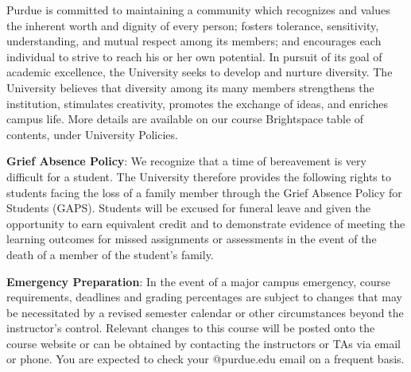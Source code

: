 \documentclass[11pt]{article}
\begin{document}
	\vspace{0.05in}
	
	Purdue is committed to maintaining a community which recognizes and values the inherent worth and 
	dignity of every person; fosters tolerance, sensitivity, understanding, and mutual respect among its 
	members; and encourages each individual to strive to reach his or her own potential. In pursuit of its goal 
	of academic excellence, the University seeks to develop and nurture diversity. The University believes 
	that diversity among its many members strengthens the institution, stimulates creativity, promotes the 
	exchange of ideas, and enriches campus life. More details are available on our course Brightspace table of 
	contents, under University Policies.
	
	\bigskip
	
	\textbf{Grief Absence Policy}: We recognize that a time of bereavement is very difficult for a student. The University therefore 
	provides the following rights to students facing the loss of a family member through the Grief 
	Absence Policy for Students (GAPS). Students will be excused for funeral leave and given the 
	opportunity to earn equivalent credit and to demonstrate evidence of meeting the learning outcomes
	for missed assignments or assessments in the event of the death of a member of the student’s family.
	
	\bigskip
	
	\textbf{Emergency Preparation}: In the event of a major campus emergency, course requirements, deadlines and grading percentages are subject to changes that may be necessitated by a revised semester calendar or other circumstances beyond 
	the instructor’s control. Relevant changes to this course will be posted onto the course website or can be 
	obtained by contacting the instructors or TAs via email or phone. You are expected to check your
	@purdue.edu email on a frequent basis.
	
\end{document}
